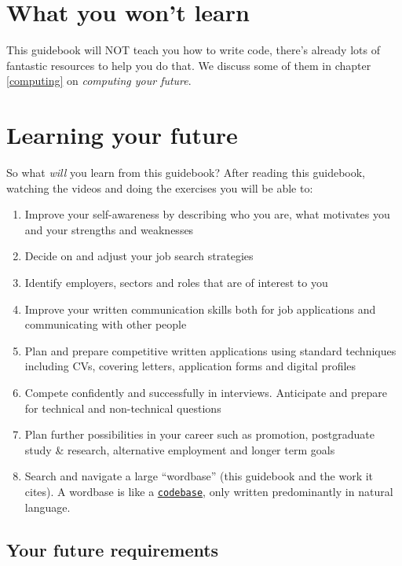 \documentclass[
]{book}
\providecommand{\tightlist}{%
  \setlength{\itemsep}{0pt}\setlength{\parskip}{0pt}}
\begin{document}
\hypertarget{nilo}{%
\section{What you won't learn}\label{nilo}}

This guidebook will NOT teach you how to write code, there's already lots of fantastic resources to help you do that. We discuss some of them in chapter \ref{computing} on \emph{computing your future}.

\hypertarget{bilo}{%
\section{Learning your future}\label{bilo}}

So what \emph{will} you learn from this guidebook? After reading this guidebook, watching the videos and doing the exercises you will be able to:

\begin{enumerate}
\def\labelenumi{\arabic{enumi}.}
\tightlist
\item
  Improve your self-awareness by describing who you are, what motivates you and your strengths and weaknesses
\item
  Decide on and adjust your job search strategies
\item
  Identify employers, sectors and roles that are of interest to you\\
\item
  Improve your written communication skills both for job applications and communicating with other people
\item
  Plan and prepare competitive written applications using standard techniques including CVs, covering letters, application forms and digital profiles
\item
  Compete confidently and successfully in interviews. Anticipate and prepare for technical and non-technical questions
\item
  Plan further possibilities in your career such as promotion, postgraduate study \& research, alternative employment and longer term goals
\item
  Search and navigate a large ``wordbase'' (this guidebook and the work it cites). A wordbase is like a \href{https://en.wikipedia.org/wiki/Codebase}{\texttt{codebase}}, only written predominantly in natural language.
\end{enumerate}

\hypertarget{prereq}{%
\subsection{Your future requirements}\label{prereq}}
\end{document}
